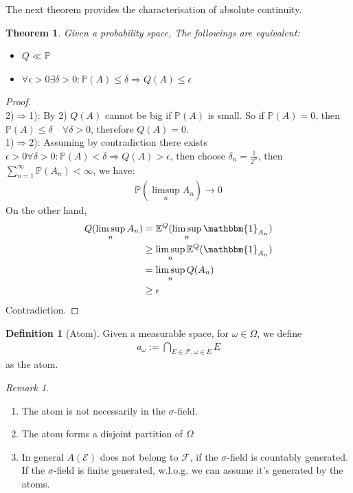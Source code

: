 \documentclass[a4paper,11pt]{book}
\newtheorem{theorem}{Theorem}[section]
\theoremstyle{definition}
\newtheorem{definition}{Definition}[section]
\theoremstyle{remark}
\newtheorem*{remark}{Remark}
\begin{document}
The next theorem provides the characterisation of absolute continuity.
\begin{theorem}
	Given a probability space, The followings are equivalent:
	\begin{itemize}
		\item $Q \ll \mathbb{P}$
		\item $\forall \epsilon > 0 \exists \delta > 0: \mathbb{P}(A) \leq \delta \Rightarrow Q(A) \leq \epsilon $
	\end{itemize}
\end{theorem}
\begin{proof}
\quad\\
2)$\Rightarrow$1): By 2) $Q(A)$ cannot be big if $\mathbb{P}(A)$ is small. So if $\mathbb{P}(A)= 0$, then $\mathbb{P}(A) \leq \delta \quad \forall \delta > 0$, therefore $Q(A) = 0$.\\ 
1)$\Rightarrow$2): Assuming by contradiction there exists $\epsilon > 0 \forall \delta > 0: \mathbb{P}(A) < \delta \Rightarrow Q(A) > \epsilon$, then choose $\delta_n = \frac{1}{2^n}$, then $\sum_{n = 1}^\infty \mathbb{P}(A_n) < \infty$, we have:
\begin{align*}
	\mathbb{P}(\limsup_n A_n) \rightarrow 0
\end{align*}
On the other hand, 
\begin{align*}
	Q(\limsup_n A_n) &= \mathbb{E}^Q(\limsup_n  \mathbbm{1}_{A_n})\\
	&\geq \limsup_n  \mathbb{E}^Q( \mathbbm{1}_{A_n})\\
	&= \limsup_n Q( A_n)\\
	&\geq \epsilon
\end{align*}
Contradiction.
\end{proof}

\begin{definition}[Atom]
	Given a measurable space, for $\omega \in \Omega$, we define
	\begin{align*}
		a_\omega := \bigcap_{E \in \mathcal{F}, \omega \in E} E
	\end{align*}
	as the atom.
\end{definition}
\begin{remark}
\quad
\begin{enumerate}
	\item The atom is not necessarily in the $\sigma$-field.
	\item The atom forms a disjoint partition of $\Omega$
	\item In general $A(\mathcal{E})$ does not belong to $\mathcal{F}$, if the $\sigma$-field is countably generated. If the $\sigma$-field is finite generated, w.l.o.g. we can assume it's generated by the atoms.
\end{enumerate}	
\end{remark}
\end{document}
